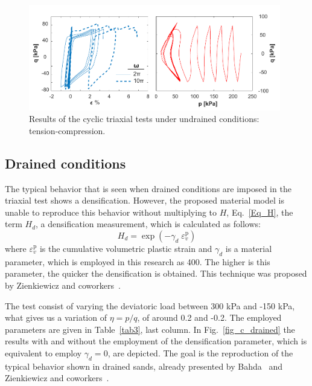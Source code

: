 \documentclass[preprint,12pt,a4paper]{elsarticle}
\begin{document}
\begin{figure}
\centering
\includegraphics[width=0.98\textwidth]{Figs/ciclo_undrained_2.pdf}
\caption{Results of the cyclic triaxial tests under undrained conditions: tension-compression.}
\label{fig_c_undrained2}
\end{figure}


\subsection{Drained conditions}
\label{subsec:52}
The typical behavior that is seen when drained conditions are imposed in the triaxial test shows a densification. However, the proposed material model is unable to reproduce this behavior without multiplying to $H$, Eq.~\eqref{Eq_H}, the term $H_d$, a densification measurement, which is calculated as follows:
\begin{equation}
H_{d}=\exp \left(-\gamma_{d} \; \varepsilon_{v}^{\mathrm{p}} \right)
\end{equation}
where $\varepsilon_{v}^{\mathrm{p}}$ is the cumulative volumetric plastic strain and $\gamma_{d}$ is a material parameter, which is employed in this research as 400. The higher is this parameter, the quicker the densification is obtained. This technique was proposed by Zienkiewicz and coworkers~\cite{Zienkiewicz99}.

The test consist of varying the deviatoric load between 300 kPa and -150 kPa, what gives us a variation of $\eta=p/q$, of around 0.2 and -0.2. The employed parameters are given in Table~\ref{tab3}, last column. In Fig.~\ref{fig_c_drained} the results with and without the employment of the densification parameter, which is equivalent to employ $\gamma_{d}=0$, are depicted. The goal is the reproduction of the typical behavior shown in drained sands, already presented by Bahda~\cite{bahda1997} and Zienkiewicz and coworkers~\cite{Zienkiewicz99}. 
\end{document}

